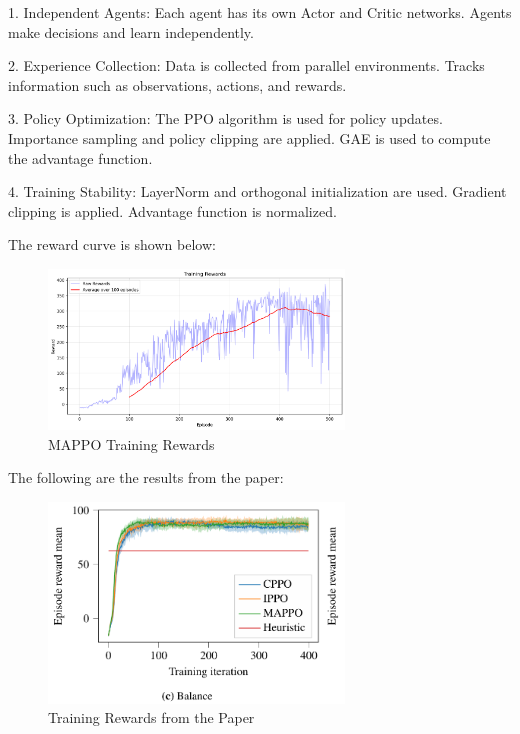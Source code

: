 \documentclass[12pt]{article}
\begin{document}
1. Independent Agents:
   Each agent has its own Actor and Critic networks.
   Agents make decisions and learn independently.

2. Experience Collection:
   Data is collected from parallel environments.
   Tracks information such as observations, actions, and rewards.

3. Policy Optimization:
   The PPO algorithm is used for policy updates.
   Importance sampling and policy clipping are applied.
   GAE is used to compute the advantage function.

4. Training Stability:
   LayerNorm and orthogonal initialization are used.
   Gradient clipping is applied.
   Advantage function is normalized.

The reward curve is shown below:

\begin{figure}[H]
    \centering
    \includegraphics[width=0.7\textwidth]{mappo_training_rewards.png}
    \caption{MAPPO Training Rewards}
    \label{fig:mappo_rewards}
\end{figure}

The following are the results from the paper:

\begin{figure}[H]
    \centering
    \includegraphics[width=0.7\textwidth]{training_rewards.png}
    \caption{Training Rewards from the Paper}
    \label{fig:paper_rewards}
\end{figure}
\end{document}
